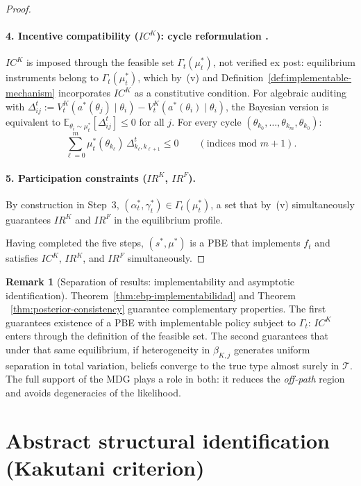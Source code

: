 \documentclass[ecta,nameyear,final,supplement]{econsocart}
\numberwithin{equation}{section}
\numberwithin{table}{section}
\theoremstyle{definition}
\newtheorem{remark}[theorem]{Remark}
\begin{document}
\begin{proof}
\paragraph{4. Incentive compatibility ($IC^K$): cycle reformulation
\citep{Rochet1987}.}
$IC^K$ is imposed through the feasible set $\Gamma_t(\mu_t^\ast)$, not verified
ex post: equilibrium instruments belong to $\Gamma_t(\mu_t^\ast)$, which by~(v)
and Definition~\ref{def:implementable-mechanism} incorporates $IC^K$ as a
constitutive condition. For algebraic auditing with
$\Delta_{ij}^t:=V^K_t(a^\ast(\theta_j)\mid\theta_i)
-V^K_t(a^\ast(\theta_i)\mid\theta_i)$, the Bayesian version is equivalent to
$\mathbb{E}_{\theta_i\sim\mu_t^\ast}[\Delta_{ij}^t]\le 0$ for all $j$.
For every cycle $(\theta_{k_0},\ldots,\theta_{k_m},\theta_{k_0})$:
\[
\sum_{\ell=0}^{m}
\mu_t^\ast(\theta_{k_\ell})\,\Delta_{k_\ell,k_{\ell+1}}^t\le 0
\qquad(\text{indices mod }m+1).
\]

\paragraph{5. Participation constraints ($IR^K$, $IR^F$).}
By construction in Step~3, $(\alpha_t^\ast,\gamma_t^\ast)\in\Gamma_t(\mu_t^\ast)$,
a set that by~(v) simultaneously guarantees $IR^K$ and $IR^F$ in the
equilibrium profile.

Having completed the five steps, $(s^\ast,\mu^\ast)$ is a PBE that implements
$f_t$ and satisfies $IC^K$, $IR^K$, and $IR^F$ simultaneously.
\end{proof}

\begin{remark}[Separation of results: implementability and asymptotic identification]
Theorem~\ref{thm:ebp-implementabilidad} and Theorem
~\ref{thm:posterior-consistency} guarantee complementary properties. The first
guarantees existence of a PBE with implementable policy subject to
$\Gamma_t$: $IC^K$ enters through the definition of the feasible set. The
second guarantees that under that same equilibrium, if heterogeneity in
$\beta_{K,j}$ generates uniform separation in total variation, beliefs converge
to the true type almost surely in $\mathcal{T}$. The full support of the MDG
plays a role in both: it reduces the \emph{off-path} region and avoids
degeneracies of the likelihood.
\end{remark}

\section{Abstract structural identification (Kakutani criterion)}
\label{sec:id-abstracta}
\end{document}
